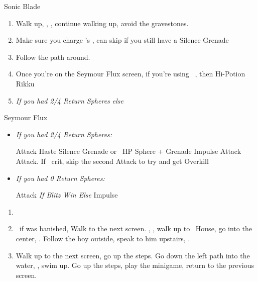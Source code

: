 \begin{multicols}{2}
\begin{equip}
  \begin{itemize}
    \auronf Sonic Blade
  \end{itemize}
\end{equip}
\begin{enumerate}[resume]
  \item Walk up, \sd, \cs[1:20], continue walking up, avoid the gravestones.
  \item Make sure you charge \rikku's \od, can skip if you still have a Silence Grenade
  \item Follow the path around.
  \item Once you're on the Seymour Flux screen, if you're using \rikku\ \od, then Hi-Potion Rikku
   \item \formation{\tidus}{\yuna}{\auron} \textit{If you had 2/4 Return Spheres else } \formation{\tidus}{\kimahri}{\wakka}
\end{enumerate}
\begin{battle}[70000]{Seymour Flux}
  \begin{itemize}
    \item \textit{If you had 2/4 Return Spheres:}
          \begin{itemize}
            \yunaf Attack
            \tidusf Haste \yuna
            \switch{\auron}{\rikku}
            \rikkuf Silence Grenade or \od\ HP Sphere + Grenade
            \summon{\bahamut}
            \bahamutf Impulse
            \yunaf Attack
            \tidusf Attack. If \yuna\ crit, skip the second Attack to try and get Overkill
          \end{itemize}
    \item \textit{If you had 0 Return Spheres:}
          \begin{itemize}
            \switch{\tidus}{\yuna}
            \summon{\bahamut}
            \bahamutf Attack \textit{If Blitz Win Else} Impulse
          \end{itemize}
  \end{itemize}
\end{battle}
\begin{enumerate}[resume]
  \item \formation{\tidus}{\kimahri}{\auron}
  \item \save\ if \bahamut was banished, Walk to the next screen. \skippablefmv[0:20], \sd, walk up to \tidus\ House, go into the center, \sd. Follow the boy outside, speak to him upstairs, \sd.
  \item Walk up to the next screen, go up the steps. Go down the left path into the water, \sd, swim up. Go up the steps, play the minigame, return to the previous screen.

\end{enumerate}
\end{multicols}
